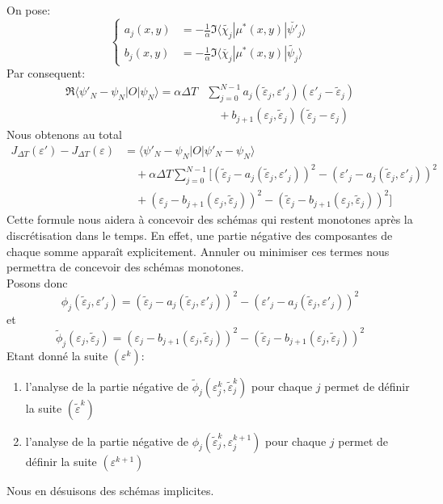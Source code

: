 On pose:
\begin{equation}
\begin{cases}
a_j(x,y) &=-\frac{1}{\alpha} \Im \langle \tilde{\chi_j}|\mu^*(x,y)|\breve{\psi'_j} \rangle \\
b_j(x,y) &= -\frac{1}{\alpha} \Im \langle \breve{\chi_j}|\mu^*(x,y)|\tilde{\psi_j} \rangle
\end{cases}
\end{equation}
Par consequent:
\begin{align*}
\Re \langle \psi'_N-\psi_N |O|\psi_N \rangle = \alpha \Delta T &\sum_{j=0}^{N-1} a_j (\tilde{\varepsilon}_j,\varepsilon'_j)(\varepsilon'_j- \tilde{\varepsilon}_j)\\
&\quad +b_{j+1} (\varepsilon_j,\tilde{\varepsilon}_j)(\tilde{\varepsilon}_j-\varepsilon_j)
\end{align*}
Nous obtenons au total
\begin{align*}
J_{\Delta T}(\varepsilon')-J_{\Delta T}(\varepsilon) &= \langle \psi'_N-\psi_N |O|\psi'_N-\psi_N \rangle \\
&\quad +\alpha \Delta T \sum_{j=0}^{N -1}[(\tilde{\varepsilon}_j-a_j(\tilde{\varepsilon}_j,\varepsilon'_j))^2 - (\varepsilon'_j-a_j(\tilde{\varepsilon}_j,\varepsilon'_j))^2\\
&\quad + (\varepsilon_j-b_{j+1}(\varepsilon_j,\tilde{\varepsilon}_j))^2 - (\tilde{\varepsilon}_j-b_{j+1}(\varepsilon_j,\tilde{\varepsilon}_j))^2]
\end{align*}
Cette formule nous aidera à concevoir des schémas qui restent monotones après la discrétisation dans le temps. En effet, une partie négative des composantes de chaque somme apparaît explicitement. Annuler ou minimiser ces termes nous permettra de concevoir des schémas monotones. \\
Posons donc
\begin{equation}
\phi_j(\tilde{\varepsilon}_j,\varepsilon'_j) = (\tilde{\varepsilon}_j-a_j(\tilde{\varepsilon}_j,\varepsilon'_j))^2 - (\varepsilon'_j-a_j(\tilde{\varepsilon}_j,\varepsilon'_j))^2
\end{equation}
et
\begin{equation}
\tilde{\phi}_j(\varepsilon_j,\tilde{\varepsilon}_j) = (\varepsilon_j-b_{j+1}(\varepsilon_j,\tilde{\varepsilon}_j))^2 - (\tilde{\varepsilon}_j-b_{j+1}(\varepsilon_j,\tilde{\varepsilon}_j))^2
\end{equation}
Etant donné la suite $(\varepsilon^{k})$:
\begin{enumerate}
	\item l'analyse de la partie négative de $\tilde{\phi}_j(\varepsilon_j^k,\tilde{\varepsilon}_j^k)$ pour chaque $j$ permet de définir la suite $(\tilde{\varepsilon}^k)$
	\item l'analyse de la partie négative de $\phi_j(\tilde{\varepsilon}_j^k,\varepsilon_j^{k+1})$ pour chaque $j$ permet de définir la suite $(\varepsilon^{k+1})$
\end{enumerate}
Nous en désuisons des schémas implicites.

